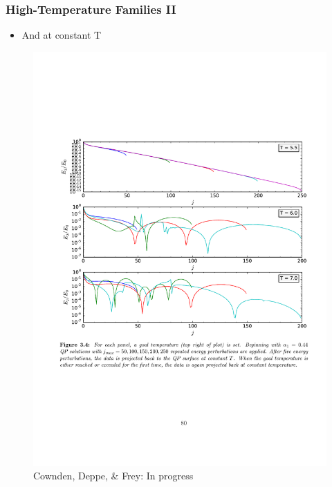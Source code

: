 \documentclass[mathserif,10pt]{beamer}
\newcommand{\bi}{\begin{itemize}}
\newcommand{\ei}{\end{itemize}}
\newcommand{\its}{\item}
\newcommand{\scr}{\scriptsize}
\begin{document}
{\frame
{
  \frametitle{High-Temperature Families II}
  \bi
  \its And at \alert{constant T}
  \ei
   \begin{figure}
    \centering
    \includegraphics[scale=0.43]{constantTproj} \\ {\scr Cownden, Deppe, \& Frey: In progress}
  \end{figure}
}

}
\end{document}
